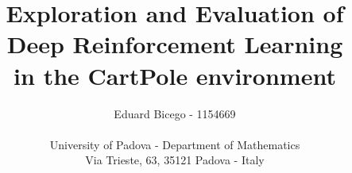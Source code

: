 \documentclass[letterpaper]{article} %
\begin{document}
%
\title{Exploration and Evaluation of Deep Reinforcement Learning \\ in the CartPole environment}

\author{Eduard Bicego - 1154669\\\\
University of Padova - Department of Mathematics\\
Via Trieste, 63, 35121 Padova - Italy\\
}

\nocopyright

\maketitle













\end{document}
